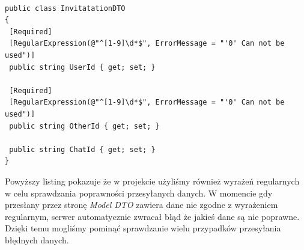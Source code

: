 \documentclass[12pt,a4paper]{article}
\begin{document}
\begin{lstlisting}[caption={Przykładowa klasa modelu DTO - Message}]

public class InvitatationDTO
{
 [Required]
 [RegularExpression(@"^[1-9]\d*$", ErrorMessage = "'0' Can not be used")]
 public string UserId { get; set; }
	
 [Required]
 [RegularExpression(@"^[1-9]\d*$", ErrorMessage = "'0' Can not be used")]
 public string OtherId { get; set; }
	
 public string ChatId { get; set; }
}
\end{lstlisting}

\hspace*{0.7cm} Powyższy listing pokazuje że w projekcie użyliśmy również wyrażeń regularnych w celu sprawdzania poprawności przesyłanych danych. W momencie gdy przesłany przez stronę \textit{Model DTO} zawiera dane nie zgodne z wyrażeniem regularnym, serwer automatycznie zwracał błąd że jakieś dane są nie poprawne. Dzięki temu mogliśmy pominąć sprawdzanie wielu przypadków przesyłania błędnych danych.
\end{document}
